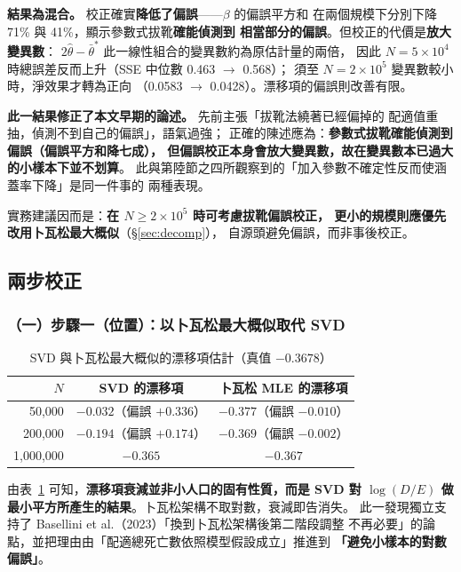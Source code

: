 \documentclass[UTF8, fontset=macnew, a4paper, 12pt]{ctexart}
\begin{document}
\textbf{結果為混合。} 校正確實\textbf{降低了偏誤}——$\beta$ 的偏誤平方和
在兩個規模下分別下降 71\% 與 41\%，顯示參數式拔靴\textbf{確能偵測到
相當部分的偏誤}。但校正的代價是\textbf{放大變異數}：
$2\hat\theta-\bar\theta^{*}$ 此一線性組合的變異數約為原估計量的兩倍，
因此 $N=5\times10^4$ 時總誤差反而上升（SSE 中位數 0.463 $\to$ 0.568）；
須至 $N=2\times10^5$ 變異數較小時，淨效果才轉為正向
（0.0583 $\to$ 0.0428）。漂移項的偏誤則改善有限。

\textbf{此一結果修正了本文早期的論述。} 先前主張「拔靴法繞著已經偏掉的
配適值重抽，偵測不到自己的偏誤」，語氣過強；
正確的陳述應為：\textbf{參數式拔靴確能偵測到偏誤（偏誤平方和降七成），
但偏誤校正本身會放大變異數，故在變異數本已過大的小樣本下並不划算}。
此與第陸節之四所觀察到的「加入參數不確定性反而使涵蓋率下降」是同一件事的
兩種表現。

\noindent 實務建議因而是：\textbf{在 $N\ge2\times10^5$ 時可考慮拔靴偏誤校正，
更小的規模則應優先改用卜瓦松最大概似}（\S\ref{sec:decomp}），
自源頭避免偏誤，而非事後校正。

\subsection{兩步校正}

\subsubsection{（一）步驟一（位置）：以卜瓦松最大概似取代 SVD}

\begin{table}[H]
\centering
\caption{SVD 與卜瓦松最大概似的漂移項估計（真值 $-0.3678$）}
\small
\begin{tabular}{rcc}
\toprule
$N$ & SVD 的漂移項 & 卜瓦松 MLE 的漂移項\\
\midrule
50,000    & $-0.032$（偏誤 $+0.336$） & $\mathbf{-0.377}$（偏誤 $-0.010$）\\
200,000   & $-0.194$（偏誤 $+0.174$） & $\mathbf{-0.369}$（偏誤 $-0.002$）\\
1,000,000 & $-0.365$ & $-0.367$\\
\bottomrule
\end{tabular}
\label{tab:drift}
\end{table}

由表~\ref{tab:drift} 可知，\textbf{漂移項衰減並非小人口的固有性質，而是 SVD 對
$\log(D/E)$ 做最小平方所產生的結果}。卜瓦松架構不取對數，衰減即告消失。
此一發現獨立支持了 Basellini et al.（2023）「換到卜瓦松架構後第二階段調整
不再必要」的論點，並把理由由「配適總死亡數依照模型假設成立」推進到
\textbf{「避免小樣本的對數偏誤」}。
\end{document}
